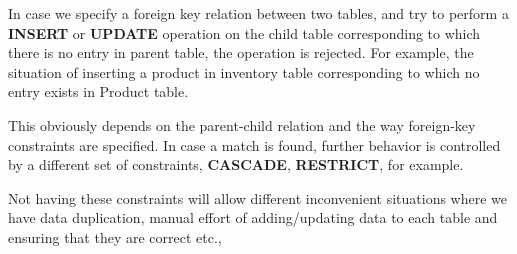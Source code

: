 \documentclass[a4]{article}
\begin{document}
In case we specify a foreign key relation between two tables, and try to 
perform a \textbf{INSERT} or \textbf{UPDATE} operation on the child table 
corresponding to which there is no entry in parent table, the operation is 
rejected. For example, the situation of inserting a product in inventory table
corresponding to which no entry exists in Product table.

This obviously depends on the parent-child relation and the way foreign-key 
constraints are specified. In case a match is found, further behavior is 
controlled by a different set of constraints, \textbf{CASCADE}, 
\textbf{RESTRICT}, for example.

Not having these constraints will allow different inconvenient situations where 
we have data duplication, manual effort of adding/updating data to each table 
and ensuring that they are correct etc.,
\end{document}
